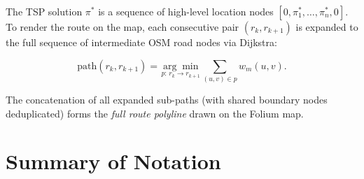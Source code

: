 \documentclass[12pt, a4paper]{article}
\theoremstyle{definition}
\begin{document}
The TSP solution $\pi^*$ is a sequence of high-level location nodes
$[0, \pi_1^*, \ldots, \pi_n^*, 0]$.  To render the route on the map, each
consecutive pair $(r_k, r_{k+1})$ is expanded to the full sequence of
intermediate OSM road nodes via Dijkstra:

\begin{equation}
  \label{eq:reconstruct}
  \text{path}(r_k, r_{k+1}) = \underset{p:\, r_k \to r_{k+1}}{\arg\min}
    \sum_{(u,v) \in p} w_m(u, v).
\end{equation}

The concatenation of all expanded sub-paths (with shared boundary nodes
deduplicated) forms the \emph{full route polyline} drawn on the Folium map.

\section{Summary of Notation}
\end{document}

